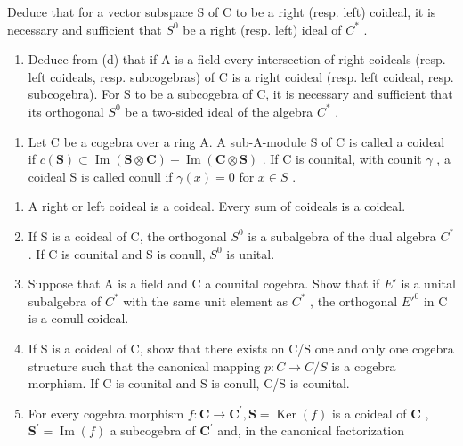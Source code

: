 Deduce that for a vector subspace S of C to be a right (resp. left) coideal, it is necessary and sufficient that \(S^{0}\) be a right (resp. left) ideal of \(C^{*}\) .

\begin{enumerate}
\def\labelenumi{(\alph{enumi})}
\setcounter{enumi}{4}
\tightlist
\item
  Deduce from (d) that if A is a field every intersection of right coideals (resp. left coideals, resp. subcogebras) of C is a right coideal (resp. left coideal, resp. subcogebra). For S to be a subcogebra of C, it is necessary and sufficient that its orthogonal \(S^{0}\) be a two-sided ideal of the algebra \(C^{*}\) .
\end{enumerate}

\begin{enumerate}
\def\labelenumi{\arabic{enumi}.}
\setcounter{enumi}{24}
\tightlist
\item
  Let C be a cogebra over a ring A. A sub-A-module S of C is called a coideal if \(c(\mathbf{S}) \subset \operatorname{Im}(\mathbf{S} \otimes \mathbf{C}) + \operatorname{Im}(\mathbf{C} \otimes \mathbf{S})\) . If C is counital, with counit \(\gamma\) , a coideal S is called conull if \(\gamma(x) = 0\) for \(x \in S\) .
\end{enumerate}

\begin{enumerate}
\def\labelenumi{(\alph{enumi})}
\item
  A right or left coideal is a coideal. Every sum of coideals is a coideal.
\item
  If S is a coideal of C, the orthogonal \(S^{0}\) is a subalgebra of the dual algebra \(C^{*}\) . If C is counital and S is conull, \(S^{0}\) is unital.
\item
  Suppose that A is a field and C a counital cogebra. Show that if \(E'\) is a unital subalgebra of \(C^{*}\) with the same unit element as \(C^{*}\) , the orthogonal \(E'^{0}\) in C is a conull coideal.
\item
  If S is a coideal of C, show that there exists on C/S one and only one cogebra structure such that the canonical mapping \(p: C \rightarrow C/S\) is a cogebra morphism. If C is counital and S is conull, C/S is counital.
\item
  For every cogebra morphism \(f\colon\mathbf{C}\to\mathbf{C}^{\prime},\mathbf{S}=\operatorname{Ker}(f)\) is a coideal of \(\mathbf{C}\) , \(\mathbf{S}^{\prime}=\operatorname{Im}(f)\) a subcogebra of \(\mathbf{C}^{\prime}\) and, in the canonical factorization
\end{enumerate}

